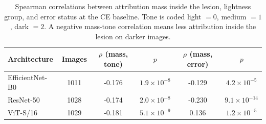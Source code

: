 \begin{table}[t]
\centering
\small
\caption{Spearman correlations between attribution mass inside the lesion, lightness group, and error status at the CE baseline. Tone is coded light $=0$, medium $=1$, dark $=2$. A negative mass-tone correlation means less attribution inside the lesion on darker images.}
\label{tab:xaicorr}
\begin{tabular}{lccccc}
\toprule
Architecture & Images & $\rho$ (mass, tone) & $p$ & $\rho$ (mass, error) & $p$ \\
\midrule
EfficientNet-B0 & 1011 & -0.176 & $1.9\times10^{-8}$ & -0.129 & $4.2\times10^{-5}$ \\
ResNet-50 & 1028 & -0.174 & $2.0\times10^{-8}$ & -0.230 & $9.1\times10^{-14}$ \\
ViT-S/16 & 1029 & -0.181 & $5.1\times10^{-9}$ & 0.136 & $1.2\times10^{-5}$ \\
\bottomrule
\end{tabular}
\end{table}
